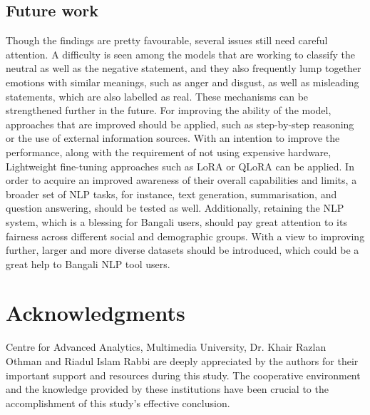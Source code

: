 \documentclass[10pt,letterpaper]{article}
\begin{document}
\subsection*{Future work}
Though the findings are pretty favourable, several issues still need careful attention. A difficulty is seen among the models that are working to classify the neutral as well as the negative statement, and they also frequently lump together emotions with similar meanings, such as anger and disgust, as well as misleading statements, which are also labelled as real. These mechanisms can be strengthened further in the future. For improving the ability of the model, approaches that are improved should be applied, such as step-by-step reasoning or the use of external information sources. With an intention to improve the performance, along with the requirement of not using expensive hardware, Lightweight fine-tuning approaches such as LoRA or QLoRA can be applied. In order to acquire an improved awareness of their overall capabilities and limits, a broader set of NLP tasks, for instance, text generation, summarisation, and question answering, should be tested as well. Additionally, retaining the NLP system, which is a blessing for Bangali users, should pay great attention to its fairness across different social and demographic groups. With a view to improving further, larger and more diverse datasets should be introduced, which could be a great help to Bangali NLP tool users.

\section*{Acknowledgments}
 Centre for Advanced Analytics, Multimedia University, Dr. Khair Razlan Othman and Riadul Islam Rabbi are deeply appreciated by the authors for their important support and resources during this study. The cooperative environment and the knowledge provided by these institutions have been crucial to the accomplishment of this study's effective conclusion.

\nolinenumbers

%
%


\end{document}
